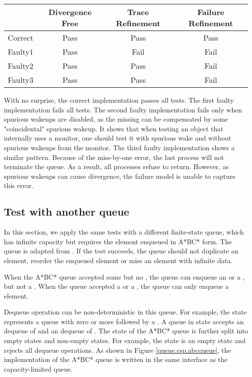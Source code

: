 \documentclass[a4paper, 12pt]{article}
\begin{document}
\begin{tabular}{c c c c}
    \hline
    & Divergence Free & Trace Refinement & Failure Refinement \\ \hline
    Correct & Pass & Pass & Pass \\ \hline
    Faulty1 & Pass & Fail & Fail \\ \hline
    Faulty2 & Pass & Pass & Fail \\ \hline
    Faulty3 & Pass & Pass & Fail \\ \hline
\end{tabular}
\newline

With no surprise, the correct implementation passes all tests. The first faulty implementation fails all tests. The second faulty implementation fails only when spurious wakeups are disabled, as the missing  can be compensated by some "coincidental" spurious wakeup. It shows that when testing an object that internally uses a monitor, one should test it with spurious wake and without spurious wakeups from the monitor. The third faulty implementation shows a similar pattern. Because of the miss-by-one error, the last process will not terminate the queue. As a result, all processes refuse to return. However, as spurious wakeups can cause divergence, the failure model is unable to capture this error. 

\subsection{Test with another queue}
In this section, we apply the same tests with a different finite-state queue, which has infinite capacity but requires the element enqueued in A*BC* form. The queue is adapted from \cite{ABC}. If the test succeeds, the queue should not duplicate an element, reorder the enqueued element or miss an element with infinite data. 

When the A*BC* queue accepted some  but no , the queue can enqueue an  or a , but not a . When the queue accepted a  or a , the queue can only enqueue a  element. 

Dequeue operation can be non-deterministic in this queue. For example, the state  represents a queue with zero or more  followed by a . A queue in state  accepts an dequeue of  and an dequeue of . The state of the A*BC* queue is further split into empty states and non-empty states. For example, the state  is an empty state and rejects all dequeue operations. As shown in Figure \ref{queue.csp.abcqueue}, the implementation of the A*BC* queue is written in the same interface as the capacity-limited queue.
\end{document}
